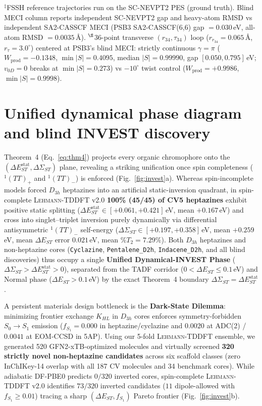\documentclass[10pt,twocolumn]{article}
\theoremstyle{natthm}
\newcommand{\leh}{\textsc{Lehmann-TDDFT}}
\newcommand{\dEST}{\Delta E_{ST}}
\newcommand{\dSig}{\Delta\Sigma_{ST}}
\begin{document}
\begin{table}[t!]
{$^\ddagger$FSSH reference trajectories run on the SC-NEVPT2 PES (ground truth). Blind MECI column reports independent SC-NEVPT2 gap and heavy-atom RMSD vs independent SA2-CASSCF MECI (PSB3 SA2-CASSCF(6,6) gap $=0.030$\,eV, all-atom RMSD $=0.0035$\,\AA).
$^\S$36-point transverse $(r_{34},\tau_{34})$ loop ($r_{r_{34}}=0.065$\,\AA, $r_\tau=3.0^\circ$) centered at PSB3's blind MECI: strictly continuous $\gamma=\pi$ ($W_{\mathrm{prod}}=-0.1348$, $\min|S|=0.4095$, median $|S|=0.99990$, gap $[0.050,0.795]$\,eV; $v_{0D}=0$ breaks at $\min|S|=0.273$) vs $-10^\circ$ twist control ($W_{\mathrm{prod}}=+0.9986$, $\min|S|=0.9998$).\par}
\end{table}

\section*{Unified dynamical phase diagram and blind INVEST discovery}
Theorem~4 (Eq.~\ref{eq:thm4}) projects every organic chromophore onto the $(\dEST^{\mathrm{stat}},\dSig)$ plane, revealing a striking unification once spin completeness ($^1(TT)_+$ and $^1(TT)_-$) is enforced (Fig.~\ref{fig:invest}a).
Whereas spin-incomplete models forced $D_{3h}$ heptazines into an artificial static-inversion quadrant, in spin-complete \leh{} v2.0 \textbf{100\% (45/45) of CV5 heptazines} exhibit positive static splitting ($\dEST^{\mathrm{stat}}\in[+0.061,+0.421]$\,eV, mean $+0.167$\,eV) and cross into singlet--triplet inversion purely dynamically via differential antisymmetric $^1(TT)_-$ self-energy ($\dSig\in[+0.197,+0.358]$\,eV, mean $+0.259$\,eV, mean $\dEST$ error $0.021$\,eV, mean $\%T_2=7.29\%$).
Both $D_{3h}$ heptazines and non-heptazine cores (\texttt{Cyclazine}, \texttt{Pentalene\_D2h}, \texttt{Indacene\_D2h}, and all blind discoveries) thus occupy a single \textbf{Unified Dynamical-INVEST Phase} ($\dSig>\dEST^{\mathrm{stat}}>0$), separated from the TADF corridor ($0<\dEST\le 0.1$\,eV) and Normal phase ($\dEST>0.1$\,eV) by the exact Theorem~4 boundary $\dSig=\dEST^{\mathrm{stat}}$.

A persistent materials design bottleneck is the \textbf{Dark-State Dilemma}\cite{pollice2021,omar2023,bedogni2024,jorner2024,pollice2024,wilson2024}: minimizing frontier exchange $K_{HL}$ in $D_{3h}$ cores enforces symmetry-forbidden $S_0\to S_1$ emission ($f_{S_1}=0.000$ in heptazine/cyclazine and $0.0020$ at ADC(2) / $0.0041$ at EOM-CCSD in 5AP\cite{wilson2024}).
Using our 5-fold \leh{} ensemble, we generated 520 GFN2-xTB-optimized\cite{bannwarth2019xtb} molecules and virtually screened \textbf{320 strictly novel non-heptazine candidates} across six scaffold classes (zero InChIKey-14 overlap with all 187 CV molecules and 34 benchmark cores).
While adiabatic DF-PBE0 predicts $0/320$ inverted cores, spin-complete \leh{} v2.0 identifies $73/320$ inverted candidates ($11$ dipole-allowed with $f_{S_1}\ge 0.01$) tracing a sharp $(\dEST,f_{S_1})$ Pareto frontier (Fig.~\ref{fig:invest}b).
\end{document}
